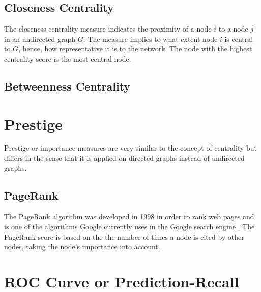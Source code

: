 \subsection{Closeness Centrality}
The closeness centrality measure indicates the proximity of a node $i$ to a node $j$ in an undirected graph $G$. The measure implies to what extent node $i$ is central to $G$, hence, how representative it is to the network. The node with the highest centrality score is the most central node.



\subsection{Betweenness Centrality}




\section{Prestige}
Prestige or importance measures are very similar to the concept of centrality but differs in the sense that it is applied on directed graphs instead of undirected graphs. 


\subsection{PageRank}
The PageRank algorithm was developed in 1998 in order to rank web pages and is one of the algorithms Google currently uses in the Google search engine \cite{langville2004deeperinside,langville2012}. The PageRank score is based on the the number of times a node is cited by other nodes, taking the node's importance into account. 


\section{ROC Curve or Prediction-Recall}


\begin{comment}
\subsection{Assortative mixing}
Assortative mixing in networks are the tendency for a high connectivity between nodes that are similar in some way \cite{newman2003}. 
\end{comment}
